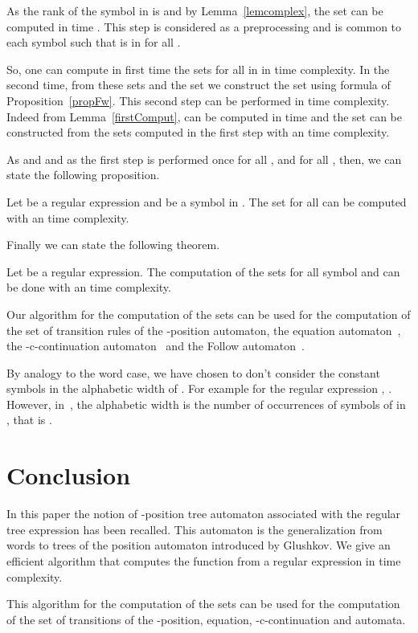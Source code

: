 \documentclass{llncs}
\begin{document}
As the rank of the symbol  in  is  and by Lemma~\ref{lemcomplex}, the set  can be computed in time . 
 This step is considered as a preprocessing and is common to each symbol  such that  is in  for all .

So, one can compute in first time the sets  for all  in  in  time complexity. In the second time, from these sets and the set  we construct the set  using  formula of Proposition~\ref{propFw}. This second step can be performed in  time complexity. Indeed from Lemma~\ref{firstComput},  can be computed in time   and the set  can be constructed from the sets computed in the first step with an  time complexity. 

\noindent As  and  and as the first step is performed once for all ,  and for all , then, we can state the following proposition.
\begin{proposition}    
Let  be a regular expression and  be a symbol in . The set  for all  can be computed with an  time complexity. 
\end{proposition}    

Finally we can state the following theorem.

\begin{theorem}
Let  be a regular expression. The computation of the  sets for all symbol  and  can be done with an  time complexity.
\end{theorem}
Our algorithm for the computation of the  sets can be used for the computation of the set of transition rules of the -position automaton, the equation automaton~\cite{automate2,cie}, the -c-continuation automaton~\cite{cie,arxiv} and the Follow automaton~\cite{arxiv}. 
\begin{remark} 
By analogy to the word case, we have chosen to don't consider the constant symbols  in the alphabetic width of . For example for the regular expression , . However, in~\cite{automate2}, the alphabetic width is the number of occurrences of symbols of  in , that is .   
\end{remark}

\section{Conclusion}
In this paper the notion of -position tree automaton associated with the regular
tree expression has been recalled. This automaton is the generalization from words to trees of the position automaton introduced by Glushkov. We give an efficient algorithm that computes the  function from a regular expression  in  time complexity. 

This algorithm for the computation of the  sets can be used for the computation of the set of transitions of the -position, equation, -c-continuation and  automata.  



\end{document}
